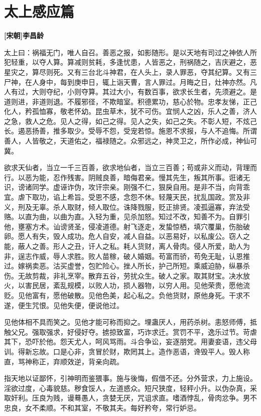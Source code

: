\documentclass[UTF8,titlepage,oneside]{ctexbook}
\begin{document}
\chapter*{太上感应篇}
\begin{center}
	\textbf{[宋朝]李昌龄}
\end{center}

太上曰：祸福无门，唯人自召。善恶之报，如影随形。是以天地有司过之神依人所犯轻重，以夺人算。算减则贫耗，多逢忧患，人皆恶之，刑祸随之，吉庆避之，恶星灾之，算尽则死。又有三台北斗神君，在人头上，录人罪恶，夺其纪算。又有三尸神，在人身中，每到庚申日，辄上诣天曹，言人罪过。月晦之日，灶神亦然。凡人有过，大则夺纪，小则夺算。其过大小，有数百事，欲求长生者，先须避之。是道则进，非道则退。不履邪径，不欺暗室。积德累功，慈心於物。忠孝友悌，正己化人，矜孤恤寡，敬老怀幼。昆虫草木，犹不可伤。宜悯人之凶，乐人之善，济人之急，救人之危。见人之得，如己之得。见人之失，如己之失。不彰人短，不炫己长。遏恶扬善，推多取少。受辱不怨，受宠若惊。施恩不求报，与人不追悔。所谓善人，人皆敬之，天道佑之，福禄随之。众邪远之，神灵卫之，所作必成，神仙可冀。

欲求天仙者，当立一千三百善，欲求地仙者，当立三百善；苟或非义而动，背理而行。以恶为能，忍作残害。阴贼良善，暗侮君亲。慢其先生，叛其所事。诳诸无识，谤诸同学。虚诬诈伪，攻讦宗亲。刚强不仁，狠戾自用。是非不当，向背乖宜。虐下取功，谄上希旨。受恩不感，念怨不休。轻蔑天民，扰乱国政。赏及非义，刑及无辜。杀人取财，倾人取位。诛降戮服，贬正排贤。凌孤逼寡，弃法受赂。以直为曲，以曲为直。入轻为重，见杀加怒。知过不改，知善不为。自罪引他，壅塞方术。讪谤贤圣，侵凌道德。射飞逐走，发蛰惊栖，填穴覆巢，伤胎破卵。愿人有失，毁人成功。危人自安，减人自益。以恶易好，以私废公。窃人之能，蔽人之善。形人之丑，讦人之私。耗人货财，离人骨肉。侵人所爱，助人为非，逞志作威，辱人求胜。败人苗稼，破人婚姻。苟富而骄，苟免无耻，认恩推过。嫁祸卖恶。沽买虚誉，包贮险心。挫人所长，护己所短。乘威迫胁，纵暴杀伤。无故剪裁，非礼烹宰。散弃五谷，劳扰众生。破人之家。取其财宝。决水放火，以害民居，紊乱规模，以败人功，损人器物，以穷人用。见他荣贵，愿他流贬。见他富有，愿他破散。见他色美，起心私之。负他货财，原他身死。干求不遂，便生咒恨。见他失便，便说他过。

见他体相不具而笑之。见他才能可称而抑之。埋蛊厌人，用药杀树。恚怒师傅，抵触父兄。强取强求，好侵好夺。掳掠致富，巧诈求迁。赏罚不平，逸乐过节。苛虐其下，恐吓於他。怨天尤人，呵风骂雨。斗合争讼，妄逐朋党。用妻妾语，违父母训。得新忘故。口是心非，贪冒於财，欺罔其上。造作恶语，谗毁平人。毁人称直，骂神称正，弃顺效逆，背亲向疏。

指天地以证鄙怀，引神明而鉴猥事。施与後悔，假借不还。分外营求，力上施设。淫欲过度，心毒貌慈。秽食馁人，左道惑众。短尺狭度，轻秤小升。以伪杂真，采取奸利。压良为贱，谩蓦愚人，贪婪无厌，咒诅求直。嗜酒悖乱，骨肉忿争。男不忠良，女不柔顺。不和其室，不敬其夫。每好矜夸，常行妒忌。
\end{document}
